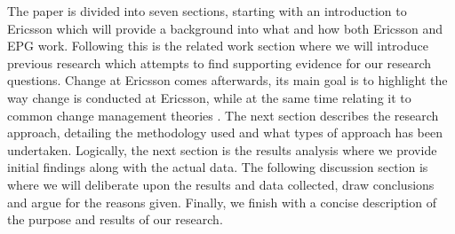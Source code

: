 \documentclass[fina_report_innit.tex]{subfiles}
\begin{document}
The paper is divided into seven sections, starting with an introduction to Ericsson which will provide a background into what and how both Ericsson and EPG work. Following this is the related work section where we will introduce previous research which attempts to find supporting evidence for our research questions. Change at Ericsson comes afterwards, its main goal is to highlight the way change is conducted at Ericsson, while at the same time relating it to common change management theories \cite{weick1999organizational}\cite{burnes2004kurt}\cite{van1995explaining}\cite{kotter1995leading}\cite{mintzberg1985strategies}. The next section describes the research approach, detailing the methodology used and what types of approach has been undertaken. Logically, the next section is the results analysis where we provide initial findings along with the actual data. The following discussion section is where we will deliberate upon the results and data collected, draw conclusions and argue for the reasons given. Finally, we finish with a concise description of the purpose and results of our research.
\end{document}
